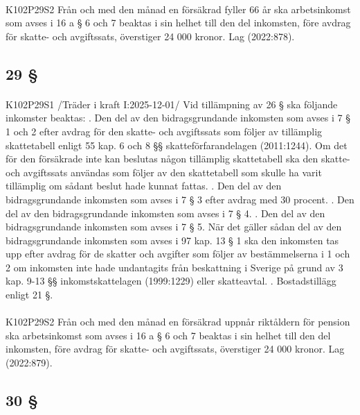\documentclass[a4paper,notitlepage,openany,10pt]{book}
\begin{document}
\paragraph*{}
{\tiny K102P29S2}
Från och med den månad en försäkrad fyller 66 år ska arbetsinkomst som avses i 16 a § 6 och 7 beaktas i sin helhet till den del inkomsten, före avdrag för skatte- och avgiftssats, överstiger 24 000 kronor.
Lag (2022:878).
\subsection*{29 §}
\paragraph*{}
{\tiny K102P29S1}
/Träder i kraft I:2025-12-01/
Vid tillämpning av 26 § ska följande inkomster beaktas:
. Den del av den bidragsgrundande inkomsten som avses i 7 § 1 och 2 efter avdrag för den skatte- och avgiftssats som följer av tillämplig skattetabell enligt 55 kap. 6 och 8 §§ skatteförfarandelagen (2011:1244). Om det för den försäkrade inte kan beslutas någon tillämplig skattetabell ska den skatte- och avgiftssats användas som följer av den skattetabell som skulle ha varit tillämplig om sådant beslut hade kunnat fattas.
. Den del av den bidragsgrundande inkomsten som avses i 7 § 3 efter avdrag med 30 procent.
. Den del av den bidragsgrundande inkomsten som avses i 7 § 4.
. Den del av den bidragsgrundande inkomsten som avses i 7 § 5. När det gäller sådan del av den bidragsgrundande inkomsten som avses i 97 kap. 13 § 1 ska den inkomsten tas upp efter avdrag för de skatter och avgifter som följer av bestämmelserna i 1 och 2 om inkomsten inte hade undantagits från beskattning i Sverige på grund av 3 kap. 9-13 §§ inkomstskattelagen (1999:1229) eller skatteavtal.
. Bostadstillägg enligt 21 §.
\paragraph*{}
{\tiny K102P29S2}
Från och med den månad en försäkrad uppnår riktåldern för pension ska arbetsinkomst som avses i 16 a § 6 och 7 beaktas i sin helhet till den del inkomsten, före avdrag för skatte- och avgiftssats, överstiger 24 000 kronor.
Lag (2022:879).
\subsection*{30 §}
\end{document}
